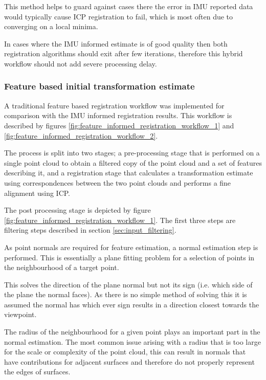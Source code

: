\documentclass{entcs}
\begin{document}
This method helps to guard against cases there the error in IMU reported data
would typically cause ICP registration to fail, which is most often due to
converging on a local minima.

In cases where the IMU informed estimate is of good quality then both
registration algorithms should exit after few iterations, therefore this hybrid
workflow should not add severe processing delay.

\subsubsection{Feature based initial transformation estimate}
\label{sec:feature_based_transform_estimate}

A traditional feature based registration workflow was implemented for comparison
with the IMU informed registration results. This workflow is described by
figures \ref{fig:feature_informed_registration_workflow_1} and
\ref{fig:feature_informed_registration_workflow_2}.

The process is split into two stages; a pre-processing stage that is performed
on a single point cloud to obtain a filtered copy of the point cloud and a set
of features describing it, and a registration stage that calculates a
transformation estimate using correspondences between the two point clouds and
performs a fine alignment using ICP.

The post processing stage is depicted by figure
\ref{fig:feature_informed_registration_workflow_1}. The first three steps are
filtering steps described in section \ref{sec:input_filtering}.

As point normals are required for feature estimation, a normal estimation step
is performed. This is essentially a plane fitting problem for a selection of
points in the neighbourhood of a target point.

This solves the direction of the plane normal but not its sign (i.e. which side
of the plane the normal faces). As there is no simple method of solving this it
is assumed the normal has which ever sign results in a direction closest towards
the viewpoint.

The radius of the neighbourhood for a given point plays an important part in
the normal estimation. The most common issue arising with a radius that is too
large for the scale or complexity of the point cloud, this can result in normals
that have contributions for adjacent surfaces and therefore do not properly
represent the edges of surfaces.
\end{document}
